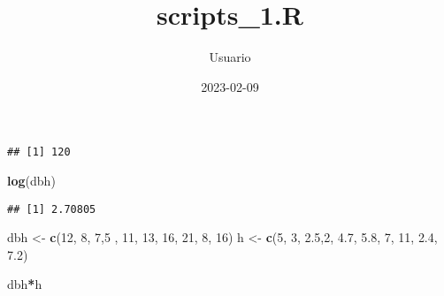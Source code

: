\documentclass[
]{article}
\title{scripts\_1.R}
\author{Usuario}
\date{2023-02-09}
\newenvironment{Shaded}{\begin{snugshade}}{\end{snugshade}}
\newcommand{\CommentTok}[1]{\textcolor[rgb]{0.56,0.35,0.01}{\textit{#1}}}
\newcommand{\DecValTok}[1]{\textcolor[rgb]{0.00,0.00,0.81}{#1}}
\newcommand{\FloatTok}[1]{\textcolor[rgb]{0.00,0.00,0.81}{#1}}
\newcommand{\KeywordTok}[1]{\textcolor[rgb]{0.13,0.29,0.53}{\textbf{#1}}}
\newcommand{\NormalTok}[1]{#1}
\newcommand{\OperatorTok}[1]{\textcolor[rgb]{0.81,0.36,0.00}{\textbf{#1}}}
\newcommand{\StringTok}[1]{\textcolor[rgb]{0.31,0.60,0.02}{#1}}
\begin{document}
\maketitle

\begin{Shaded}
\end{Shaded}

\begin{verbatim}
## [1] 120
\end{verbatim}

\begin{Shaded}
\begin{Highlighting}[]
\KeywordTok{log}\NormalTok{(dbh)}
\end{Highlighting}
\end{Shaded}

\begin{verbatim}
## [1] 2.70805
\end{verbatim}

\begin{Shaded}
\begin{Highlighting}[]
\NormalTok{dbh <-}\StringTok{  }\KeywordTok{c}\NormalTok{(}\DecValTok{12}\NormalTok{, }\DecValTok{8}\NormalTok{, }\DecValTok{7}\NormalTok{,}\DecValTok{5}\NormalTok{ , }\DecValTok{11}\NormalTok{, }\DecValTok{13}\NormalTok{, }\DecValTok{16}\NormalTok{, }\DecValTok{21}\NormalTok{, }\DecValTok{8}\NormalTok{, }\DecValTok{16}\NormalTok{)}
\NormalTok{h <-}\StringTok{ }\KeywordTok{c}\NormalTok{(}\DecValTok{5}\NormalTok{, }\DecValTok{3}\NormalTok{, }\FloatTok{2.5}\NormalTok{,}\DecValTok{2}\NormalTok{, }\FloatTok{4.7}\NormalTok{, }\FloatTok{5.8}\NormalTok{, }\DecValTok{7}\NormalTok{, }\DecValTok{11}\NormalTok{, }\FloatTok{2.4}\NormalTok{, }\FloatTok{7.2}\NormalTok{)}

\NormalTok{dbh}\OperatorTok{*}\NormalTok{h}
\end{Highlighting}
\end{Shaded}
\end{document}
